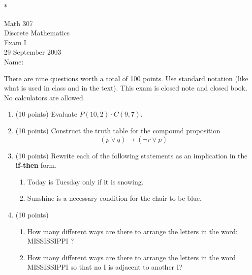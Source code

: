 \pagestyle{empty} \setlength{\topmargin}{-.5in}
\addtolength{\textheight}{2in} \addtolength{\oddsidemargin}{-1in}
\addtolength{\textwidth}{2in} \setlength{\parindent}{0pt}

* \vfill
\Large{
\begin{center}Math 307\\
Discrete Mathematics\\
Exam I\\
29 September 2003\\
\vspace{1in} Name:{\underline{\hspace{2in}}}\\\end{center}

\vspace{1in} There are nine questions worth a total of 100 points.
Use standard notation (like what is used in class and in the text).
This exam is closed note and closed book. No calculators are
allowed.

\vfill *

\newpage
\begin{enumerate}
\item (10 points) Evaluate $P(10,2) \cdot C(9,7).$
\vspace{1in}

\item (10 points) Construct the truth table for the compound proposition
$$( p \vee q) \rightarrow ( \neg r \underline{\vee} p)$$
\vfill




\item (10 points) Rewrite each of the following statements as an implication
in the {\bf if-then} form. \begin{enumerate} \item Today is Tuesday
only if it is snowing. \vspace{1in} \item Sunshine is a necessary
condition for the chair to be blue. \vspace{1in}
\end{enumerate}

\newpage
\item (10 points) \begin{enumerate} \item How many different ways are there
 to arrange the letters in the word: MISSISSIPPI ? \vspace{1in}
\item How many different ways are there to arrange the letters in the
word MISSISSIPPI so that no I is adjacent to another I? \vspace{2in}
\end{enumerate}



\end{enumerate}}
